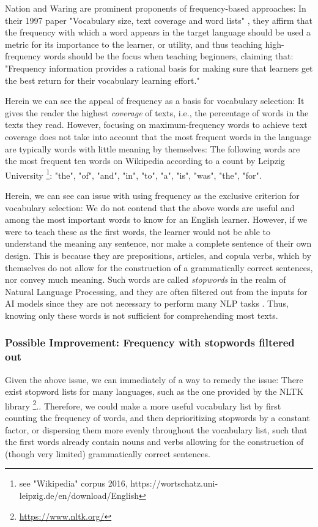 Nation and Waring are prominent proponents of frequency-based approaches:
In their 1997 paper "Vocabulary size, text coverage and word lists" \cite{nationVocabularySizeText1997}, they affirm that the frequency with which a word appears in the target language should be used a metric for its importance to the learner, or utility, and thus teaching high-frequency words should be the focus when teaching beginners, claiming that:
"Frequency information provides a rational basis for making sure that learners get the best return for their vocabulary learning effort."

Herein we can see the appeal of frequency as a basis for vocabulary selection:
It gives the reader the highest \textit{coverage} of texts, i.e., the percentage of words in the texts they read.
However, focusing on maximum-frequency words to achieve text coverage does not take into account that the most frequent words in the language are typically words with little meaning by themselves: 
The following words are the most frequent ten words on Wikipedia according to a count by Leipzig University \footnote{see "Wikipedia" corpus 2016, https://wortschatz.uni-leipzig.de/en/download/English}:
"the", "of", "and", "in", "to", "a", "is", "was", "the", "for".

Herein, we can see can issue with using frequency as the exclusive criterion for vocabulary selection:
We do not contend that the above words are useful and among the most important words to know for an English learner.
However, if we were to teach these as the first words, the learner would not be able to understand the meaning any sentence, nor make a complete sentence of their own design.
This is because they are prepositions, articles, and copula verbs, which by themselves do not allow for the construction of a grammatically correct sentences, nor convey much meaning.
Such words are called \textit{stopwords} in the realm of Natural Language Processing, and they are often filtered out from the inputs for AI models since they are not necessary to perform many NLP tasks .
Thus, knowing only these words is not sufficient for comprehending most texts.


\subsubsection {Possible Improvement: Frequency with stopwords filtered out}
Given the above issue, we can immediately of a way to remedy the issue:
There exist stopword lists for many languages, such as the one provided by the NLTK library \footnote{\url{https://www.nltk.org/}}..
Therefore, we could make a more useful vocabulary list by first counting the frequency of words, and then deprioritizing stopwords by a constant factor, or dispersing them more evenly throughout the vocabulary list, such that the first words already contain nouns and verbs allowing for the construction of (though very limited) grammatically correct sentences.


